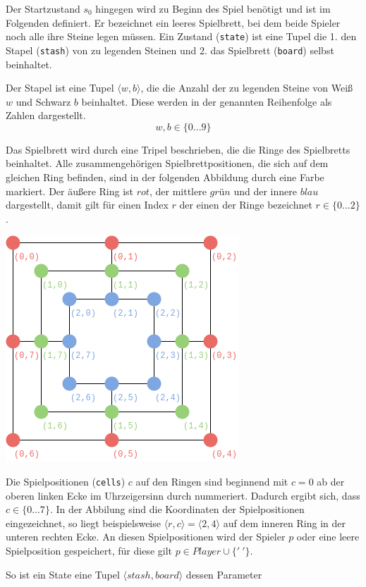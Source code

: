 \documentclass[11pt]{article}
\begin{document}
Der Startzustand \(s_0\) hingegen wird zu Beginn des Spiel benötigt und
ist im Folgenden definiert. Er bezeichnet ein leeres Spielbrett, bei dem
beide Spieler noch alle ihre Steine legen müssen. Ein Zustand
(\texttt{state}) ist eine Tupel die 1. den Stapel (\texttt{stash}) von
zu legenden Steinen und 2. das Spielbrett (\texttt{board}) selbst
beinhaltet.

Der Stapel ist eine Tupel \(\langle w, b \rangle\), die die Anzahl der
zu legenden Steine von Weiß \(w\) und Schwarz \(b\) beinhaltet. Diese
werden in der genannten Reihenfolge als Zahlen dargestellt.
\[w, b \in \{0...9\}\]

Das Spielbrett wird durch eine Tripel beschrieben, die die Ringe des
Spielbretts beinhaltet. Alle zusammengehörigen Spielbrettpositionen, die
sich auf dem gleichen Ring befinden, sind in der folgenden Abbildung
durch eine Farbe markiert. Der äußere Ring ist \(rot\), der mittlere
\(grün\) und der innere \(blau\) dargestellt, damit gilt für einen Index
\(r\) der einen der Ringe bezeichnet \(r \in \{0...2\}\).

\includegraphics{../images/nmm-rings.png}

Die Spielpositionen (\texttt{cells}) \(c\) auf den Ringen sind beginnend
mit \(c=0\) ab der oberen linken Ecke im Uhrzeigersinn durch nummeriert.
Dadurch ergibt sich, dass \(c \in \{0...7\}\). In der Abbilung sind die
Koordinaten der Spielpositionen eingezeichnet, so liegt beispielsweise
\(\langle r,c \rangle = \langle 2,4 \rangle\) auf dem inneren Ring in
der unteren rechten Ecke. An diesen Spielpositionen wird der Spieler
\(p\) oder eine leere Spielposition gespeichert, für diese gilt
\(p \in Player \cup \{'\ '\}\).

So ist ein State eine Tupel \(\langle stash, board \rangle\) dessen
Parameter 
\end{document}
